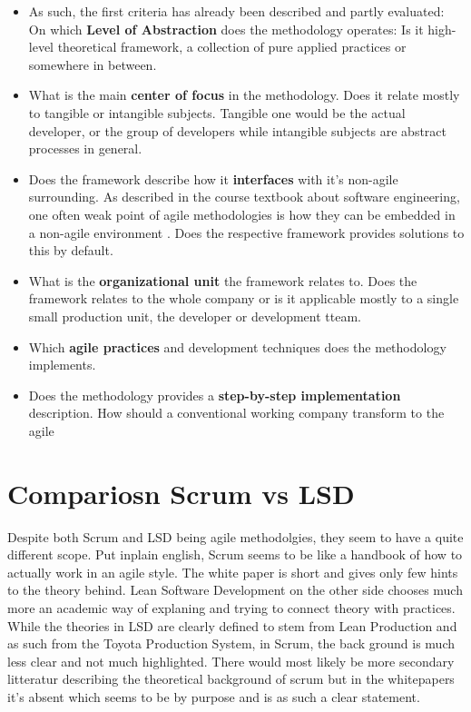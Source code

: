 \documentclass[a4paper,11pt,twoside]{article}
\begin{document}
\begin{itemize}
\item As such, the first criteria has already been described and partly evaluated: On which \textbf{Level of Abstraction} does the methodology operates: Is it high-level theoretical framework, a collection of pure applied practices or somewhere in between.

\item What is the main \textbf{center of focus} in the methodology. Does it relate mostly to tangible or intangible subjects. Tangible one would be the actual developer, or the group of developers while intangible subjects are abstract processes in general. 

\item Does the framework describe how it \textbf{interfaces} with it's non-agile surrounding. As described in the course textbook about software engineering, one often weak point of agile methodologies is how they can be embedded in a non-agile environment \cite[p.91 ]{sommerville2016}. Does the respective framework provides solutions to this by default.

\item What is the \textbf{organizational unit} the framework relates to. Does the framework relates to the whole company or is it applicable mostly to a single small production unit, the developer or development tteam.

\item Which \textbf{agile practices} and development techniques does the methodology implements. 

\item Does the methodology provides a \textbf{step-by-step implementation} description. How should a conventional working company transform to the agile 


\end{itemize}
\section{Compariosn Scrum vs LSD}
Despite both Scrum and LSD being agile methodolgies, they seem to have a quite different scope. Put inplain english, Scrum seems to be like a handbook of how to actually work in an agile style. The white paper is short and gives only few hints to the theory behind. Lean Software Development on the other side chooses much more an academic way of explaning and trying to connect theory with practices. While the theories in LSD are clearly defined to stem from Lean Production and as such from the Toyota Production System, in Scrum, the back ground is much less clear and not much highlighted. There would most likely be more secondary litteratur describing the theoretical background of scrum but in the whitepapers it's absent which seems to be by purpose and is as such a clear statement.
\end{document}

